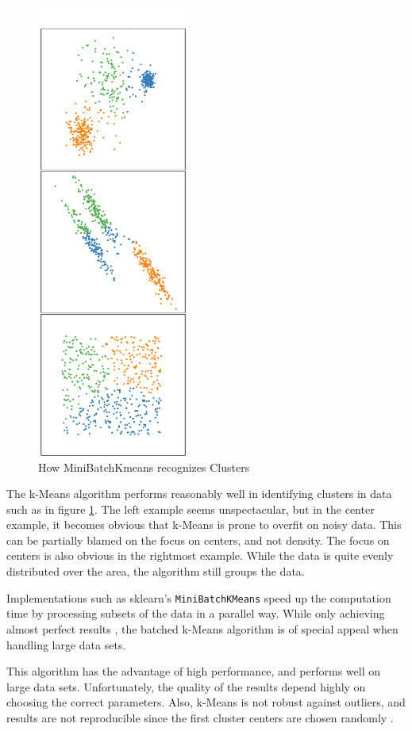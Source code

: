 			 \begin{figure}[!h]
		\centering
		\includegraphics[height=15cm, angle=90]{Bilder/models/minibkmeans.pdf}
		\caption{How MiniBatchKmeans recognizes Clusters \cite{sklearn}}
		\label{fig:kmeans-viz}
		\end{figure}
	
		The k-Means algorithm performs reasonably well in identifying clusters in data such as in figure \ref{fig:kmeans-viz}. The left example seems unspectacular, but in the center example, it becomes obvious that k-Means is prone to overfit on noisy data. This can be partially blamed on the focus on centers, and not density. The focus on centers is also obvious in the rightmost example. While the data is quite evenly distributed over the area, the algorithm still groups the data. 
		
		Implementations such as \ac{sklearn}'s \lstinline|MiniBatchKMeans| \cite{sklearn} speed up the computation time by processing subsets of the data in a parallel way. While only achieving almost perfect results \cite{sculleyWebscaleKmeansClustering2010}, the batched k-Means algorithm is of special appeal when handling large data sets.
		
		This algorithm has the advantage of high performance, and performs well on large data sets. Unfortunately, the quality of the results depend highly on choosing the correct parameters. Also, k-Means is not robust against outliers, and results are not reproducible since the first cluster centers are chosen randomly \cite[c.6.2]{40algorithms}.
		
